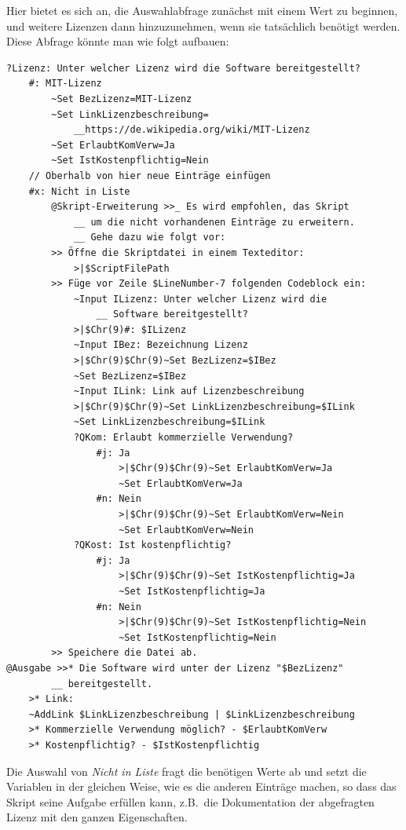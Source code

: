 Hier bietet es sich an, die Auswahlabfrage zunächst mit einem Wert zu beginnen, und weitere Lizenzen dann hinzuzunehmen, wenn sie tatsächlich benötigt werden. Diese Abfrage könnte man wie folgt aufbauen:

\label{BspLizenzabfrage}
\begin{verbatim}
?Lizenz: Unter welcher Lizenz wird die Software bereitgestellt?
    #: MIT-Lizenz
        ~Set BezLizenz=MIT-Lizenz
        ~Set LinkLizenzbeschreibung=
            __https://de.wikipedia.org/wiki/MIT-Lizenz
        ~Set ErlaubtKomVerw=Ja
        ~Set IstKostenpflichtig=Nein
    // Oberhalb von hier neue Einträge einfügen
    #x: Nicht in Liste
        @Skript-Erweiterung >>_ Es wird empfohlen, das Skript
            __ um die nicht vorhandenen Einträge zu erweitern. 
            __ Gehe dazu wie folgt vor:
        >> Öffne die Skriptdatei in einem Texteditor:
            >|$ScriptFilePath
        >> Füge vor Zeile $LineNumber-7 folgenden Codeblock ein:
            ~Input ILizenz: Unter welcher Lizenz wird die 
                __ Software bereitgestellt?
            >|$Chr(9)#: $ILizenz
            ~Input IBez: Bezeichnung Lizenz
            >|$Chr(9)$Chr(9)~Set BezLizenz=$IBez
            ~Set BezLizenz=$IBez
            ~Input ILink: Link auf Lizenzbeschreibung
            >|$Chr(9)$Chr(9)~Set LinkLizenzbeschreibung=$ILink
            ~Set LinkLizenzbeschreibung=$ILink
            ?QKom: Erlaubt kommerzielle Verwendung?
                #j: Ja
                    >|$Chr(9)$Chr(9)~Set ErlaubtKomVerw=Ja
                    ~Set ErlaubtKomVerw=Ja
                #n: Nein
                    >|$Chr(9)$Chr(9)~Set ErlaubtKomVerw=Nein
                    ~Set ErlaubtKomVerw=Nein
            ?QKost: Ist kostenpflichtig?
                #j: Ja
                    >|$Chr(9)$Chr(9)~Set IstKostenpflichtig=Ja
                    ~Set IstKostenpflichtig=Ja
                #n: Nein
                    >|$Chr(9)$Chr(9)~Set IstKostenpflichtig=Nein
                    ~Set IstKostenpflichtig=Nein
        >> Speichere die Datei ab.
@Ausgabe >>* Die Software wird unter der Lizenz "$BezLizenz"        
        __ bereitgestellt.
    >* Link: 
    ~AddLink $LinkLizenzbeschreibung | $LinkLizenzbeschreibung
    >* Kommerzielle Verwendung möglich? - $ErlaubtKomVerw
    >* Kostenpflichtig? - $IstKostenpflichtig
\end{verbatim}

Die Auswahl von \emph{Nicht in Liste} fragt die benötigen Werte ab und setzt die Variablen in der gleichen Weise, wie es die anderen Einträge machen, so dass das Skript seine Aufgabe erfüllen kann, z.B.\ die Dokumentation der abgefragten Lizenz mit den ganzen Eigenschaften.

